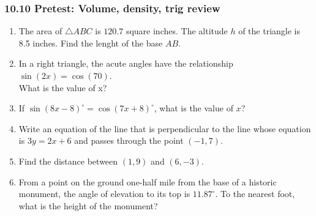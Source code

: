 \documentclass[12pt, twoside]{article}
\begin{document}
\subsubsection*{10.10 Pretest: Volume, density, trig review}
 \begin{enumerate}

   \item The area of $\triangle ABC$ is $120.7$ square inches. The altitude $h$ of the triangle is 8.5 inches. Find the lenght of the base $AB$.\\[0.5cm]
    \vspace{0.5cm}

  \item In a right triangle, the acute angles have the relationship $\sin (2x)=\cos(70)$.\\[0.25cm]
    What is the value of x? \vspace{2.5cm}

  \item If $\sin (8x-8)^\circ = \cos(7x+8)^\circ$, what is the value of $x$? \vspace{3cm}

  \item Write an equation of the line that is perpendicular to the line whose equation is $3y=2x+6$ and passes through the point $(-1,7)$. \vspace{2cm}

  \item Find the distance between $(1,9)$ and $(6, -3)$.

\newpage
  \item From a point on the ground one-half mile from the base of a historic monument, the angle of elevation to its top is $11.87^\circ$. To the nearest foot, what is the height of the monument?\\[1cm]
    \vspace{3cm}


\end{enumerate}
\end{document}
